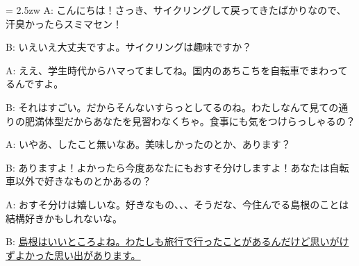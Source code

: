 \documentclass[11pt]{amsart}
\title{}
\author{}
\newenvironment{hangall}[1]{\hangindent = 2.5zw\everypar{\hangindent = 2.5zw}}{}
\begin{document}
\maketitle
\begin{hangall}{}%
A: こんにちは！さっき、サイクリングして戻ってきたばかりなので、汗臭かったらスミマセン！

B: いえいえ大丈夫ですよ。サイクリングは趣味ですか？

A: ええ、学生時代からハマってましてね。国内のあちこちを自転車でまわってるんですよ。

B: それはすごい。だからそんないすらっとしてるのね。わたしなんて見ての通りの肥満体型だからあなたを見習わなくちゃ。食事にも気をつけらっしゃるの？

A: いやあ、したこと無いなあ。美味しかったのとか、あります？

B: ありますよ！よかったら今度あなたにもおすそ分けしますよ！あなたは自転車以外で好きなものとかあるの？

A: おすそ分けは嬉しいな。好きなもの、、、そうだな、今住んでる島根のことは結構好きかもしれないな。

B: \ul{島根はいいところよね。わたしも旅行で行ったことがあるんだけど思いがけずよかった思い出があります。}\end{hangall}
\end{document}
